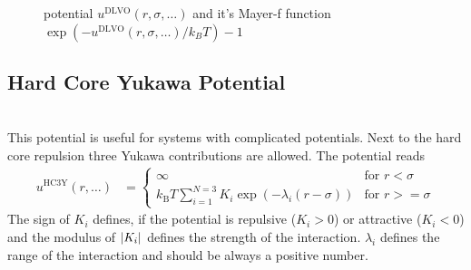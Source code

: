 \begin{figure}[htb]
\centering
  \quad
  \caption{potential $u^\text{DLVO}(r,\sigma,\ldots)$ and it's Mayer-f function $\exp(-u^\text{DLVO}(r,\sigma,\ldots)/k_BT)-1$}
\end{figure}

\newpage
\subsection{Hard Core Yukawa Potential}
~\\

This potential is useful for systems with complicated potentials. Next to the hard core repulsion three
Yukawa contributions are allowed. The potential reads
\begin{align}
u^\text{HC3Y}(r,\ldots) &=
\begin{cases}
\infty                                                                  & \mbox{for } r<   \sigma \\
k_\text{B} T
\displaystyle \sum_{i=1}^{N=3} K_i\exp\left(-\lambda_i(r-\sigma)\right)& \mbox{for } r >= \sigma
\end{cases}
\end{align}
The sign of $K_i$ defines, if the potential is
repulsive ($K_i>0$) or attractive ($K_i<0$) and the modulus of $\abs{K_i}$ defines the strength of the interaction. $\lambda_i$ defines the range of the interaction and should be always a positive number.

